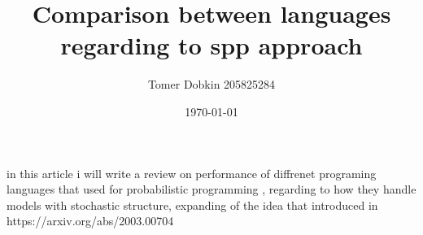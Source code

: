 \documentclass{article}
\title{Comparison between languages regarding to spp approach}
\author{Tomer Dobkin 205825284}
\date{\today}
\begin{document}
\maketitle
in this article i will write a review on performance of diffrenet programing languages that used for probabilistic programming , regarding to how they handle models with stochastic structure, expanding of the idea that introduced in https://arxiv.org/abs/2003.00704
\end{document}
